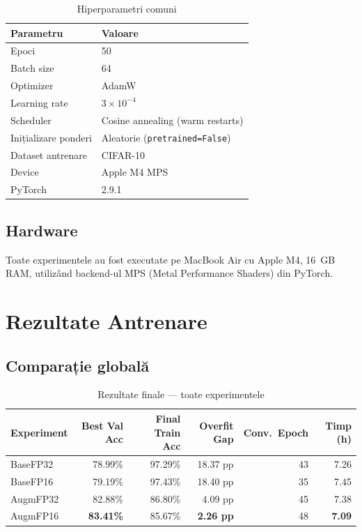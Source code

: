 \documentclass[12pt,a4paper]{article}
\begin{document}
\begin{table}[H]
  \centering
  \caption{Hiperparametri comuni}
  \begin{tabular}{ll}
    \toprule
    \textbf{Parametru} & \textbf{Valoare} \\
    \midrule
    Epoci               & 50 \\
    Batch size           & 64 \\
    Optimizer            & AdamW \\
    Learning rate        & $3 \times 10^{-4}$ \\
    Scheduler            & Cosine annealing (warm restarts) \\
    Inițializare ponderi & Aleatorie (\texttt{pretrained=False}) \\
    Dataset antrenare    & CIFAR-10 \\
    Device               & Apple M4 MPS \\
    PyTorch              & 2.9.1 \\
    \bottomrule
  \end{tabular}
  \label{tab:training_config}
\end{table}

\subsection{Hardware}

Toate experimentele au fost executate pe MacBook Air cu Apple M4, 16~GB RAM,
utilizând backend-ul MPS (Metal Performance Shaders) din PyTorch.

\section{Rezultate Antrenare}

\subsection{Comparație globală}

\begin{table}[H]
  \centering
  \caption{Rezultate finale --- toate experimentele}
  \begin{tabular}{lrrrrr}
    \toprule
    \textbf{Experiment} & \textbf{Best Val Acc} & \textbf{Final Train Acc} &
    \textbf{Overfit Gap} & \textbf{Conv.\ Epoch} & \textbf{Timp (h)} \\
    \midrule
    BaseFP32 & 78.99\% & 97.29\% & 18.37 pp & 43 & 7.26 \\
    BaseFP16 & 79.19\% & 97.43\% & 18.40 pp & 35 & 7.45 \\
    AugmFP32 & 82.88\% & 86.80\% & \phantom{0}4.09 pp & 45 & 7.38 \\
    AugmFP16 & \textbf{83.41\%} & 85.67\% & \textbf{\phantom{0}2.26 pp} & 48 & \textbf{7.09} \\
    \bottomrule
  \end{tabular}
  \label{tab:all_results}
\end{table}
\end{document}
